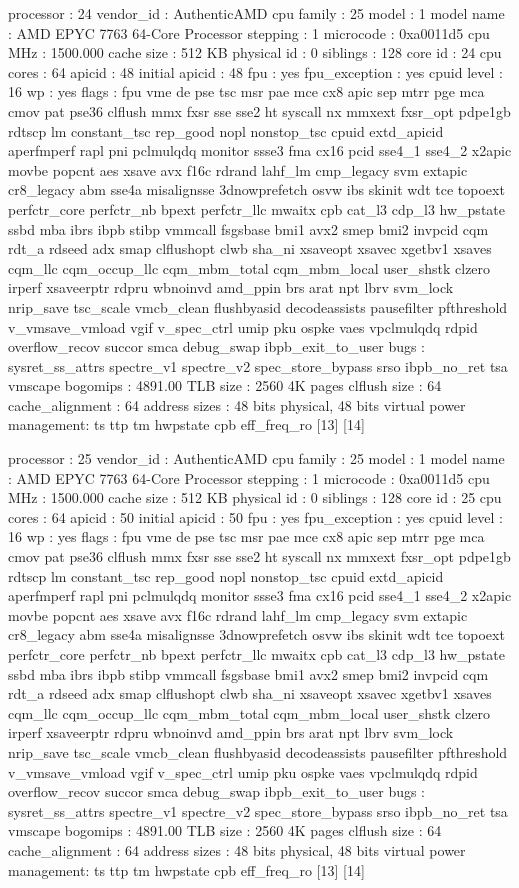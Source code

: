 processor	: 24
vendor_id	: AuthenticAMD
cpu family	: 25
model		: 1
model name	: AMD EPYC 7763 64-Core Processor
stepping	: 1
microcode	: 0xa0011d5
cpu MHz		: 1500.000
cache size	: 512 KB
physical id	: 0
siblings	: 128
core id		: 24
cpu cores	: 64
apicid		: 48
initial apicid	: 48
fpu		: yes
fpu_exception	: yes
cpuid level	: 16
wp		: yes
flags		: fpu vme de pse tsc msr pae mce cx8 apic sep mtrr pge mca cmov pat pse36 clflush mmx fxsr sse sse2 ht syscall nx mmxext fxsr_opt pdpe1gb rdtscp lm constant_tsc rep_good nopl nonstop_tsc cpuid extd_apicid aperfmperf rapl pni pclmulqdq monitor ssse3 fma cx16 pcid sse4_1 sse4_2 x2apic movbe popcnt aes xsave avx f16c rdrand lahf_lm cmp_legacy svm extapic cr8_legacy abm sse4a misalignsse 3dnowprefetch osvw ibs skinit wdt tce topoext perfctr_core perfctr_nb bpext perfctr_llc mwaitx cpb cat_l3 cdp_l3 hw_pstate ssbd mba ibrs ibpb stibp vmmcall fsgsbase bmi1 avx2 smep bmi2 invpcid cqm rdt_a rdseed adx smap clflushopt clwb sha_ni xsaveopt xsavec xgetbv1 xsaves cqm_llc cqm_occup_llc cqm_mbm_total cqm_mbm_local user_shstk clzero irperf xsaveerptr rdpru wbnoinvd amd_ppin brs arat npt lbrv svm_lock nrip_save tsc_scale vmcb_clean flushbyasid decodeassists pausefilter pfthreshold v_vmsave_vmload vgif v_spec_ctrl umip pku ospke vaes vpclmulqdq rdpid overflow_recov succor smca debug_swap ibpb_exit_to_user
bugs		: sysret_ss_attrs spectre_v1 spectre_v2 spec_store_bypass srso ibpb_no_ret tsa vmscape
bogomips	: 4891.00
TLB size	: 2560 4K pages
clflush size	: 64
cache_alignment	: 64
address sizes	: 48 bits physical, 48 bits virtual
power management: ts ttp tm hwpstate cpb eff_freq_ro [13] [14]

processor	: 25
vendor_id	: AuthenticAMD
cpu family	: 25
model		: 1
model name	: AMD EPYC 7763 64-Core Processor
stepping	: 1
microcode	: 0xa0011d5
cpu MHz		: 1500.000
cache size	: 512 KB
physical id	: 0
siblings	: 128
core id		: 25
cpu cores	: 64
apicid		: 50
initial apicid	: 50
fpu		: yes
fpu_exception	: yes
cpuid level	: 16
wp		: yes
flags		: fpu vme de pse tsc msr pae mce cx8 apic sep mtrr pge mca cmov pat pse36 clflush mmx fxsr sse sse2 ht syscall nx mmxext fxsr_opt pdpe1gb rdtscp lm constant_tsc rep_good nopl nonstop_tsc cpuid extd_apicid aperfmperf rapl pni pclmulqdq monitor ssse3 fma cx16 pcid sse4_1 sse4_2 x2apic movbe popcnt aes xsave avx f16c rdrand lahf_lm cmp_legacy svm extapic cr8_legacy abm sse4a misalignsse 3dnowprefetch osvw ibs skinit wdt tce topoext perfctr_core perfctr_nb bpext perfctr_llc mwaitx cpb cat_l3 cdp_l3 hw_pstate ssbd mba ibrs ibpb stibp vmmcall fsgsbase bmi1 avx2 smep bmi2 invpcid cqm rdt_a rdseed adx smap clflushopt clwb sha_ni xsaveopt xsavec xgetbv1 xsaves cqm_llc cqm_occup_llc cqm_mbm_total cqm_mbm_local user_shstk clzero irperf xsaveerptr rdpru wbnoinvd amd_ppin brs arat npt lbrv svm_lock nrip_save tsc_scale vmcb_clean flushbyasid decodeassists pausefilter pfthreshold v_vmsave_vmload vgif v_spec_ctrl umip pku ospke vaes vpclmulqdq rdpid overflow_recov succor smca debug_swap ibpb_exit_to_user
bugs		: sysret_ss_attrs spectre_v1 spectre_v2 spec_store_bypass srso ibpb_no_ret tsa vmscape
bogomips	: 4891.00
TLB size	: 2560 4K pages
clflush size	: 64
cache_alignment	: 64
address sizes	: 48 bits physical, 48 bits virtual
power management: ts ttp tm hwpstate cpb eff_freq_ro [13] [14]

